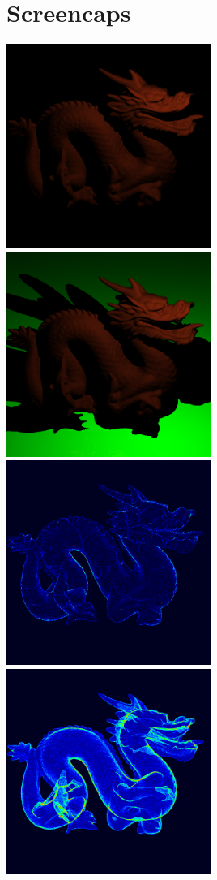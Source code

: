 \section{Screencaps}

 
\includegraphics[width=0.5\textwidth]{img/dragon.png}
\includegraphics[width=0.5\textwidth]{img/dragon-plane.png}
\includegraphics[width=0.5\textwidth]{img/dragon-traversal-ordered.png}
\includegraphics[width=0.5\textwidth]{img/dragon-traversal-unordered.png}
